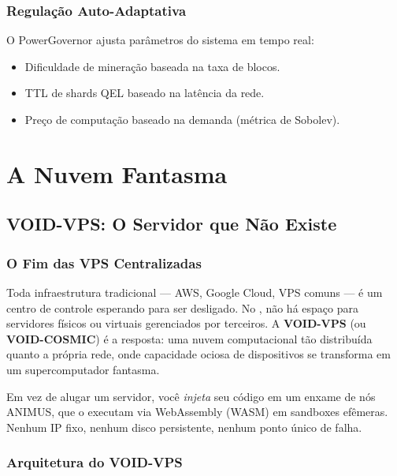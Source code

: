 \documentclass[12pt,a4paper,twoside]{book}
\theoremstyle{remark}
\newcommand{\ET}{\text{ETΞRNET}}
\begin{document}
\section{Regulação Auto-Adaptativa}

O PowerGovernor ajusta parâmetros do sistema em tempo real:

\begin{itemize}
    \item Dificuldade de mineração baseada na taxa de blocos.
    \item TTL de shards QEL baseado na latência da rede.
    \item Preço de computação baseado na demanda (métrica de Sobolev).
\end{itemize}

\part{A Nuvem Fantasma}

\chapter{VOID-VPS: O Servidor que Não Existe}
\label{chap:voidvps}

\section{O Fim das VPS Centralizadas}

Toda infraestrutura tradicional — AWS, Google Cloud, VPS comuns — é um centro de controle esperando para ser desligado. No \ET, não há espaço para servidores físicos ou virtuais gerenciados por terceiros. A \textbf{VOID-VPS} (ou \textbf{VOID-COSMIC}) é a resposta: uma nuvem computacional tão distribuída quanto a própria rede, onde capacidade ociosa de dispositivos se transforma em um supercomputador fantasma.

Em vez de alugar um servidor, você \textit{injeta} seu código em um enxame de nós ANIMUS, que o executam via WebAssembly (WASM) em sandboxes efêmeras. Nenhum IP fixo, nenhum disco persistente, nenhum ponto único de falha.

\section{Arquitetura do VOID-VPS}
\end{document}
